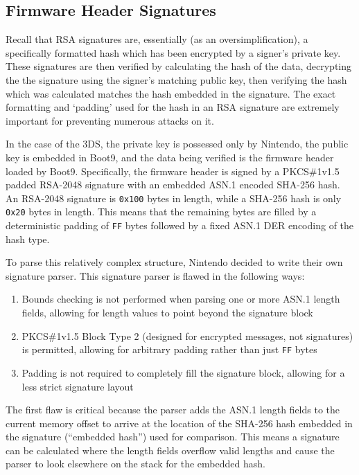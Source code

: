 \documentclass[journal]{IEEEtran}
\begin{document}
\subsection{Firmware Header Signatures}

Recall that RSA signatures are, essentially (as an oversimplification), a
specifically formatted hash which has been encrypted by a signer's private key.
These signatures are then verified by calculating the hash of the data,
decrypting the the signature using the signer's matching public key, then
verifying the hash which was calculated matches the hash embedded in the
signature. The exact formatting and `padding' used for the hash in an RSA
signature are extremely important for preventing numerous attacks on it.

In the case of the 3DS, the private key is possessed only by Nintendo, the
public key is embedded in Boot9, and the data being verified is the firmware
header loaded by Boot9. Specifically, the firmware header is signed by a
PKCS\#1v1.5 padded RSA-2048 signature with an embedded ASN.1 encoded SHA-256
hash. An RSA-2048 signature is \texttt{0x100} bytes in length, while a SHA-256
hash is only \texttt{0x20} bytes in length. This means that the remaining bytes
are filled by a deterministic padding of \texttt{FF} bytes followed by a fixed
ASN.1 DER encoding of the hash type.

To parse this relatively complex structure, Nintendo decided to write their own
signature parser. This signature parser is flawed in the following
ways\cite{33c3}:

\medskip
\begin{enumerate}
  \item Bounds checking is not performed when parsing one or more ASN.1 length
  fields, allowing for length values to point beyond the signature block
  \item PKCS\#1v1.5 Block Type 2 (designed for encrypted messages, not
  signatures) is permitted, allowing for arbitrary padding rather than just
  \texttt{FF} bytes
  \item Padding is not required to completely fill the signature block, allowing
  for a less strict signature layout
\end{enumerate}
\medskip

The first flaw is critical because the parser adds the ASN.1 length fields to
the current memory offset to arrive at the location of the SHA-256 hash embedded
in the signature (``embedded hash'') used for comparison. This means a signature
can be calculated where the length fields overflow valid lengths and cause the
parser to look elsewhere on the stack for the embedded hash.
\end{document}
